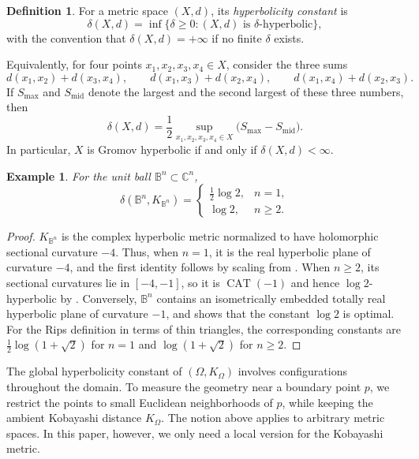 \documentclass[11pt]{article}
\newtheorem{example}[theorem]{Example}
\theoremstyle{definition}
\newtheorem{definition}[theorem]{Definition}
\begin{document}
\begin{definition}\label{def:hyperbolicity-constant}
For a metric space \((X,d)\), its \emph{hyperbolicity constant} is
\[
\delta(X,d)
=
\inf\{\delta\ge0:(X,d)\text{ is }\delta\text{-hyperbolic}\},
\]
with the convention that \(\delta(X,d)=+\infty\) if no finite
\(\delta\) exists.
\end{definition}

Equivalently, for four points \(x_1,x_2,x_3,x_4\in X\), consider the
three sums
\[
d(x_1,x_2)+d(x_3,x_4),\qquad
d(x_1,x_3)+d(x_2,x_4),\qquad
d(x_1,x_4)+d(x_2,x_3).
\]
If \(S_{\max}\) and \(S_{\mathrm{mid}}\) denote the largest and the
second largest of these three numbers, then
\begin{equation}\label{eq:global-fourpoint-constant}
\delta(X,d)
=
\frac12
\sup_{x_1,x_2,x_3,x_4\in X}
\bigl(S_{\max}-S_{\mathrm{mid}}\bigr).
\end{equation}
In particular, \(X\) is Gromov hyperbolic if and only if
\(\delta(X,d)<\infty\).

\begin{example}
For the unit ball $\mathbb B^n\subset\mathbb C^n$,
\[
\delta(\mathbb B^n,K_{\mathbb B^n})
=
\begin{cases}
\frac12\log 2, & n=1,\\
\log 2, & n\geq 2.
\end{cases}
\]

\end{example}
\begin{proof}
 $K_{\mathbb B^n}$ is the complex hyperbolic metric normalized to
have holomorphic sectional curvature $-4$. Thus, when $n=1$, it is the
real hyperbolic plane of curvature $-4$, and the first identity follows
by scaling from \cite[Corollary~5.4]{NicaSpakula}. When $n\geq2$, its
sectional curvatures lie in $[-4,-1]$, so it is $\operatorname{CAT}(-1)$
and hence $\log 2$-hyperbolic by
\cite[Theorems~4.2 and~5.1]{NicaSpakula}. Conversely, $\mathbb B^n$
contains an isometrically embedded totally real hyperbolic plane of
curvature $-1$, and \cite[Corollary~5.4]{NicaSpakula} shows that the
constant $\log 2$ is optimal. For the Rips definition in terms of thin triangles, the corresponding
constants are $\frac12\log(1+\sqrt2)$ for $n=1$ and
$\log(1+\sqrt2)$ for $n\ge2$.
\end{proof}
The global hyperbolicity constant of \((\Omega,K_\Omega)\) involves
configurations throughout the domain.  To measure the geometry near a
boundary point \(p\), we restrict the points to small Euclidean
neighborhoods of \(p\), while keeping the ambient Kobayashi distance
\(K_\Omega\).  The notion above applies to arbitrary metric spaces.  In this
paper, however, we only need a local version for the Kobayashi metric.
\end{document}
